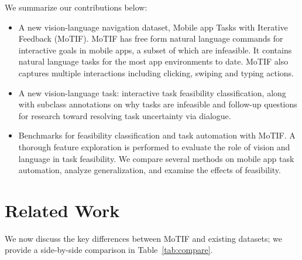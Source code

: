 We summarize our contributions below:
\begin{itemize}
    \item A new vision-language navigation dataset, Mobile app Tasks with Iterative Feedback (MoTIF). MoTIF has free form natural language commands for interactive goals in mobile apps, a subset of which are infeasible. It contains natural language tasks for the most app environments to date. MoTIF also captures multiple interactions including clicking, swiping and typing actions.
    \item A new vision-language task: interactive task feasibility classification, along with subclass annotations on why tasks are infeasible and follow-up questions for research toward resolving task uncertainty via dialogue. 
    \item Benchmarks for feasibility classification and task automation with MoTIF. A thorough feature exploration is performed to evaluate the role of vision and language in task feasibility. We compare several methods on mobile app task automation, analyze generalization, and examine the effects of feasibility.
\end{itemize}
\section{Related Work}
We now discuss the key differences between MoTIF and existing datasets; we provide a side-by-side comparison in Table~\ref{tab:compare}.
\smallskip 

